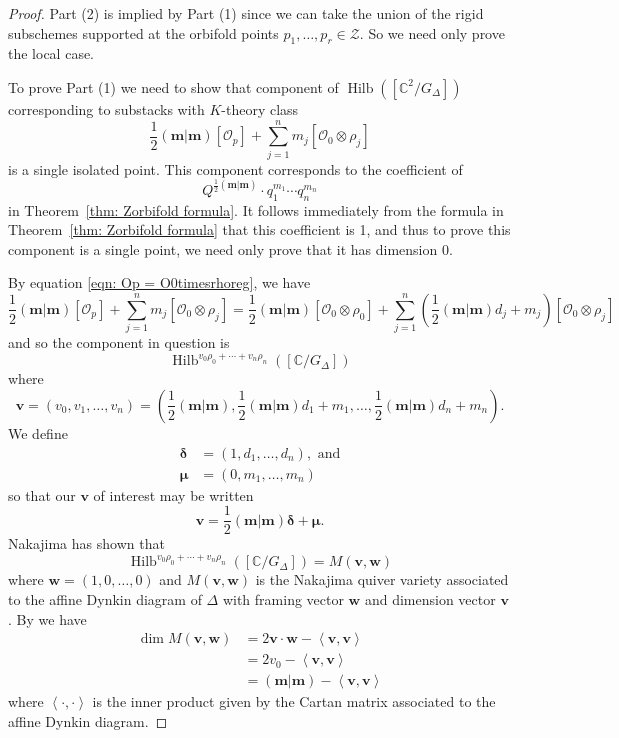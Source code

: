 \documentclass{amsart}
\theoremstyle{definition}
\newcommand{\half}{\frac{1}{2}}
\newcommand{\CC} {{\mathbb C}}          %
\renewcommand{\O}{\mathcal{O}}
\newcommand{\mvec}{\bm{m}}
\newcommand{\deltavec}{\bm{\delta  }}
\newcommand{\muvec}{\bm{\mu  }}
\newcommand{\vvec}{\bm{v }}
\newcommand{\wvec}{\bm{w }}
\newcommand{\Hilb}{\operatorname{Hilb}}
\begin{document}
\begin{proof}
	Part (2) is implied by Part (1) since we can take the union of the rigid subschemes supported at the orbifold points $p_1,\dots,p_r \in \mathcal{Z}$. So we need only prove the local case.
	
To prove Part (1) we need to show that component of $\Hilb
([\CC^{2}/G_{\Delta}])$ corresponding to substacks with $K$-theory
class
\[
\half (\mvec|\mvec)[\O_{p}] + \sum_{j=1}^{n}
m_{j}[\O_{0}\otimes \rho_{j}]
\]
is a single isolated point. This component corresponds to the
coefficient of 
\[
Q^{\half(\mvec |\mvec )}\cdot  q_{1}^{m_{1}}\dotsb q_{n}^{m_{n}}
\]
in Theorem~\ref{thm: Zorbifold formula}. It follows immediately from
the formula in Theorem~\ref{thm: Zorbifold formula} that this
coefficient is 1, and thus to prove this component is a single point,
we need only prove that it has dimension 0.

By equation \eqref{eqn: Op
= O0timesrhoreg}, we have
\[
\half (\mvec|\mvec)[\O_{p}] + \sum_{j=1}^{n}
m_{j}[\O_{0}\otimes \rho_{j}] = 
\half (\mvec|\mvec)[\O_{0}\otimes \rho_{0}] + \sum_{j=1}^{n}
\left(\half (\mvec |\mvec )d_{j}+m_{j} \right)[\O_{0}\otimes \rho_{j}]
\]
and so the component in question is 
\[
\Hilb^{v_{0}\rho_{0}+\dotsb +v_{n}\rho_{n}}([\CC /G_{\Delta}])
\]
where
\[
\vvec =(v_{0},v_{1},\dotsc ,v_{n}) = \left(\half (\mvec |\mvec ),\half (\mvec |\mvec )d_{1}+m_{1},\dotsc ,\half (\mvec |\mvec )d_{n}+m_{n} \right).
\]
We define
\begin{align*}
\deltavec& = (1,d_{1},\dotsc ,d_{n}),\text{ and}\\
\muvec &= (0,m_{1},\dotsc ,m_{n})
\end{align*}
so that our $\vvec$ of interest may be written
\[
\vvec =\half (\mvec |\mvec )\deltavec +\muvec .
\]
Nakajima has shown \cite[\S~2]{nakajima2002geometric} that 
\[
\Hilb^{v_{0}\rho_{0}+\dotsb +v_{n}\rho_{n}}([\CC /G_{\Delta}]) = M(\vvec ,\wvec )
\]
where $\wvec = (1,0,\dotsc ,0)$ and $M(\vvec ,\wvec )$ is the Nakajima
quiver variety associated to the affine Dynkin diagram of $\Delta$
with framing vector $\wvec$ and dimension vector $\vvec$. By
\cite[(2.6)]{nakajima1994instantons} we have 
\begin{align*}
\dim M(\vvec ,\wvec )& = 2\vvec \cdot \wvec -\left\langle \vvec ,\vvec \right\rangle\\
&= 2v_{0} - \left\langle \vvec ,\vvec \right\rangle\\
&=(\mvec |\mvec ) - \left\langle \vvec ,\vvec\right\rangle
\end{align*}
where $\left\langle \cdot , \cdot  \right\rangle$ is the inner product
given by the Cartan matrix associated to the affine Dynkin diagram.


\end{proof}
\end{document}
